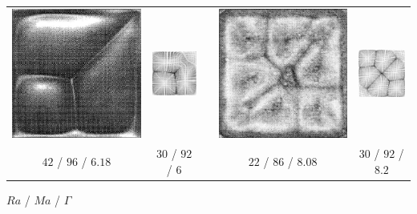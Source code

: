\documentclass[compress,12pt]{beamer}
\begin{document}
\begin{frame}
\begin{tabular}{ccccc}
    \includegraphics[width=.2\textwidth]{figures/3cell_exp} &
    \includegraphics[width=.2\textwidth]{figures/3cell_AR6} &
    \hspace{.05\textwidth} &
    \includegraphics[width=.2\textwidth]{figures/6cell_exp} &
    \includegraphics[width=.2\textwidth]{figures/6cell_AR8point4} \\

    $42$  / $96$  / $6.18$ &
    $30$  / $92$  / $6$ &
    & %
    $22$  / $86$  / $8.08$ &
    $30$  / $92$  / $8.2$ \\ %
    
  \end{tabular}
  
  \centerline{$Ra$ / $Ma$ / $\Gamma$ }

\end{frame}





\end{document}
